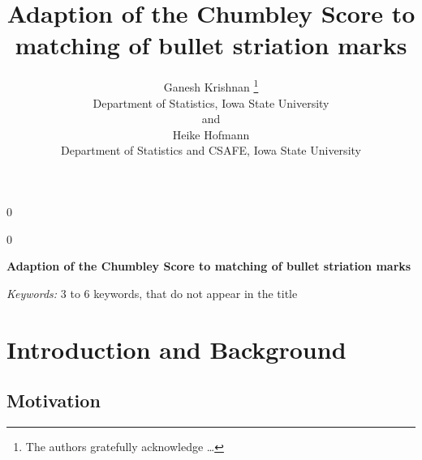 \documentclass[12pt]{article}
\newcommand{\blind}{0}
\begin{document}
\def\spacingset#1{\renewcommand{\baselinestretch}%
{#1}\small\normalsize} \spacingset{1}



\blind
{
  \title{\bf Adaption of the Chumbley Score to matching of bullet striation marks}

  \author{
        Ganesh Krishnan \thanks{The authors gratefully acknowledge \ldots{}} \\
    Department of Statistics, Iowa State University\\
     and \\     Heike Hofmann \\
    Department of Statistics and CSAFE, Iowa State University\\
      }
  \maketitle
} \fi

\blind
{
  \bigskip
  \bigskip
  \bigskip
  \begin{center}
    {\LARGE\bf Adaption of the Chumbley Score to matching of bullet striation marks}
  \end{center}
  \medskip
} \fi

\bigskip
\begin{abstract}

\end{abstract}

\noindent%
{\it Keywords:} 3 to 6 keywords, that do not appear in the title
\vfill

\newpage
\spacingset{1.45} %

\newcommand{\hh}[1]{{\textcolor{orange}{#1}}}
\newcommand{\gk}[1]{{\textcolor{green}{#1}}}
\newcommand{\cited}[1]{{\textcolor{red}{#1}}}

\setlength\parindent{0pt}

\tableofcontents
\newpage

\section{Introduction and Background}\label{introduction-and-background}

\subsection{Motivation}\label{motivation}
\end{document}
